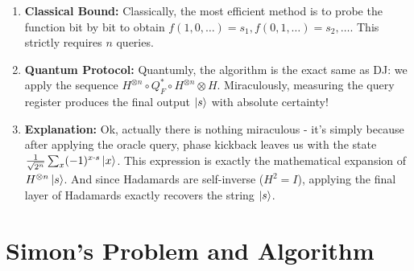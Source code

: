 \begin{enumerate}
    \item \textbf{Classical Bound:} Classically, the most efficient method is to probe the function bit by bit to obtain $f(1,0,\dots)=s_1, f(0,1,\dots)=s_2, \dots$. This strictly requires $n$ queries.
    \item \textbf{Quantum Protocol:} Quantumly, the algorithm is the exact same as DJ: we apply the sequence $H^{\otimes n} \circ Q_F^* \circ H^{\otimes n}\otimes H$. Miraculously, measuring the query register produces the final output $\ket{s}$ with absolute certainty!
    \item \textbf{Explanation:} Ok, actually there is nothing miraculous - it's simply because after applying the oracle query, phase kickback leaves us with the state $\frac{1}{\sqrt{2^n}} \sum_x (-1)^{x \cdot s} \ket{x}$. This expression is exactly the mathematical expansion of $H^{\otimes n}\ket{s}$. And since Hadamards are self-inverse ($H^2 = I$), applying the final layer of Hadamards exactly recovers the string $\ket{s}$.
\end{enumerate}

\section{Simon's Problem and Algorithm}

